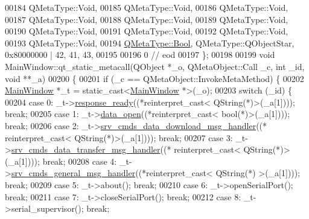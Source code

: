 \begin{DoxyCode}
00184     QMetaType::Void,
00185     QMetaType::Void,
00186     QMetaType::Void,
00187     QMetaType::Void,
00188     QMetaType::Void,
00189     QMetaType::Void,
00190     QMetaType::Void,
00191     QMetaType::Void,
00192     QMetaType::Void,
00193     QMetaType::Void,
00194     \hyperlink{a00001_a76a8b016e5ad61faf9062cc387df5016}{QMetaType::Bool}, QMetaType::QObjectStar, 0x80000000 | 42,   41,   43,
00195 
00196        0        \textcolor{comment}{// eod}
00197 \};
00198 
00199 \textcolor{keywordtype}{void} MainWindow::qt\_static\_metacall(QObject *\_o, QMetaObject::Call \_c, \textcolor{keywordtype}{int} \_id, \textcolor{keywordtype}{void} **\_a)
00200 \{
00201     \textcolor{keywordflow}{if} (\_c == QMetaObject::InvokeMetaMethod) \{
00202         \hyperlink{a00006}{MainWindow} *\_t = \textcolor{keyword}{static\_cast<}\hyperlink{a00006}{MainWindow} *\textcolor{keyword}{>}(\_o);
00203         \textcolor{keywordflow}{switch} (\_id) \{
00204         \textcolor{keywordflow}{case} 0: \_t->\hyperlink{a00006_a3f6396874778799cf07a7a0149e54977}{response\_ready}((*\textcolor{keyword}{reinterpret\_cast<} QString(*)\textcolor{keyword}{>}(\_a[1]))); \textcolor{keywordflow}{break};
00205         \textcolor{keywordflow}{case} 1: \_t->\hyperlink{a00006_a35b895072769864ac42f8cd732267e4b}{data\_open}((*\textcolor{keyword}{reinterpret\_cast<} \textcolor{keywordtype}{bool}(*)\textcolor{keyword}{>}(\_a[1]))); \textcolor{keywordflow}{break};
00206         \textcolor{keywordflow}{case} 2: \_t->\hyperlink{a00006_ac84167866950dd1eb9a29a5293546c1a}{srv\_cmds\_data\_download\_msg\_handler}((*\textcolor{keyword}{
      reinterpret\_cast<} QString(*)\textcolor{keyword}{>}(\_a[1]))); \textcolor{keywordflow}{break};
00207         \textcolor{keywordflow}{case} 3: \_t->\hyperlink{a00006_ae19ec21c1009c81700a8ad2e1f81be07}{srv\_cmds\_data\_transfer\_msg\_handler}((*\textcolor{keyword}{
      reinterpret\_cast<} QString(*)\textcolor{keyword}{>}(\_a[1]))); \textcolor{keywordflow}{break};
00208         \textcolor{keywordflow}{case} 4: \_t->\hyperlink{a00006_a8a8cd34488e8ee213350afb5b2261677}{srv\_cmds\_general\_msg\_handler}((*\textcolor{keyword}{reinterpret\_cast<} QString(*)\textcolor{keyword}{
      >}(\_a[1]))); \textcolor{keywordflow}{break};
00209         \textcolor{keywordflow}{case} 5: \_t->about(); \textcolor{keywordflow}{break};
00210         \textcolor{keywordflow}{case} 6: \_t->openSerialPort(); \textcolor{keywordflow}{break};
00211         \textcolor{keywordflow}{case} 7: \_t->closeSerialPort(); \textcolor{keywordflow}{break};
00212         \textcolor{keywordflow}{case} 8: \_t->serial\_supervisor(); \textcolor{keywordflow}{break};

\end{DoxyCode}
